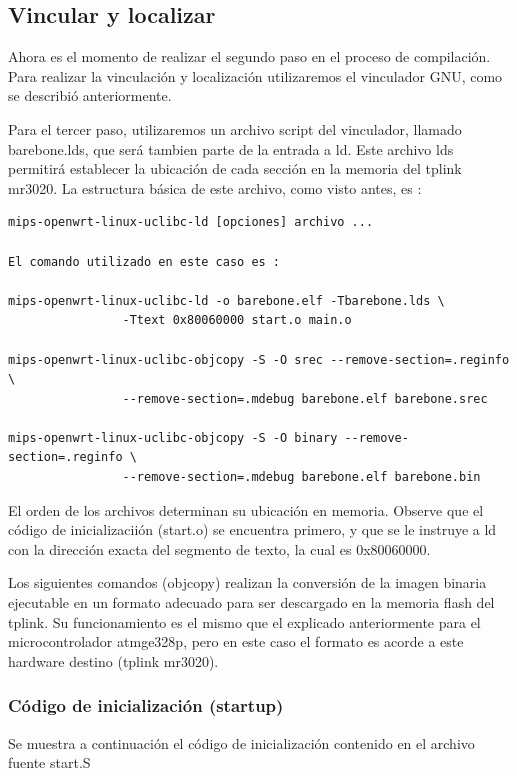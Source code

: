 \documentclass[output=paper, 
colorlinks,
citecolor=brown,
newtxmath
]{langscibook}
\begin{document}
\subsection {Vincular y localizar}

Ahora es el momento de realizar el segundo paso en el proceso de compilación.
Para realizar la vinculación y localización utilizaremos el vinculador GNU,
como se describió anteriormente.

Para el tercer paso, utilizaremos un archivo script del vinculador, llamado
barebone.lds, que será tambien parte de la entrada a ld. Este archivo lds
permitirá establecer la ubicación de cada sección en la memoria del tplink
mr3020.  La estructura básica de este archivo, como visto antes, es :

\begin{verbatim}
mips-openwrt-linux-uclibc-ld [opciones] archivo ...

El comando utilizado en este caso es :

mips-openwrt-linux-uclibc-ld -o barebone.elf -Tbarebone.lds \
                -Ttext 0x80060000 start.o main.o

mips-openwrt-linux-uclibc-objcopy -S -O srec --remove-section=.reginfo \
                --remove-section=.mdebug barebone.elf barebone.srec

mips-openwrt-linux-uclibc-objcopy -S -O binary --remove-section=.reginfo \
                --remove-section=.mdebug barebone.elf barebone.bin
\end{verbatim}


El orden de los archivos determinan su ubicación en memoria. Observe
que el código de inicializaciión (start.o) se encuentra primero, y que
se le instruye a ld con la dirección exacta del segmento de texto,
la cual es 0x80060000.

Los siguientes comandos (objcopy) realizan la conversión de la imagen 
binaria ejecutable
en un formato adecuado para ser descargado en la memoria flash del tplink.
Su funcionamiento es el mismo que el explicado anteriormente 
para el microcontrolador atmge328p, pero en este caso el formato
es acorde a este hardware destino (tplink mr3020).


\subsubsection {Código de inicialización (startup)}

Se muestra a continuación el código de inicialización contenido en el archivo
fuente start.S
\end{document}
